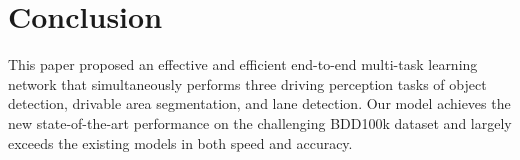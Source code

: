 \documentclass[10pt,twocolumn,letterpaper]{article}
\begin{document}
\section{Conclusion}
This paper proposed an effective and efficient end-to-end multi-task learning network that simultaneously performs three driving perception tasks of object detection, drivable area segmentation, and lane detection. Our model achieves the new state-of-the-art performance on the challenging BDD100k dataset and largely exceeds the existing models in both speed and accuracy.



{\small


}
\end{document}
